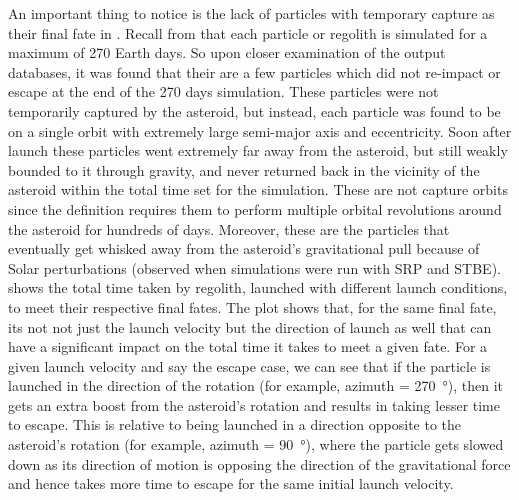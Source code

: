 An important thing to notice is the lack of particles with temporary capture as their final fate in . Recall from  that each particle or regolith is simulated for a maximum of 270 Earth days. So upon closer examination of the output databases, it was found that their are a few particles which did not re-impact or escape at the end of the 270 days simulation. These particles were not temporarily captured by the asteroid, but instead, each particle was found to be on a single orbit with extremely large semi-major axis and eccentricity. Soon after launch these particles went extremely far away from the asteroid, but still weakly bounded to it through gravity, and never returned back in the vicinity of the asteroid within the total time set for the simulation. These are not capture orbits since the definition requires them to perform multiple orbital revolutions around the asteroid for hundreds of days. Moreover, these are the particles that eventually get whisked away from the asteroid's gravitational pull because of Solar perturbations (observed when simulations were run with \gls{SRP} and \gls{STBE}).
%
\newline\newline
%
 shows the total time taken by regolith, launched with different launch conditions, to meet their respective final fates. The plot shows that, for the same final fate, its not not just the launch velocity but the direction of launch as well that can have a significant impact on the total time it takes to meet a given fate. For a given launch velocity and say the escape case, we can see that if the particle is launched in the direction of the rotation (for example, azimuth = \SI{270}{\degree}), then it gets an extra boost from the asteroid's rotation and results in taking lesser time to escape. This is relative to being launched in a direction opposite to the asteroid's rotation (for example, azimuth = \SI{90}{\degree}), where the particle gets slowed down as its direction of motion is opposing the direction of the gravitational force and hence takes more time to escape for the same initial launch velocity.
